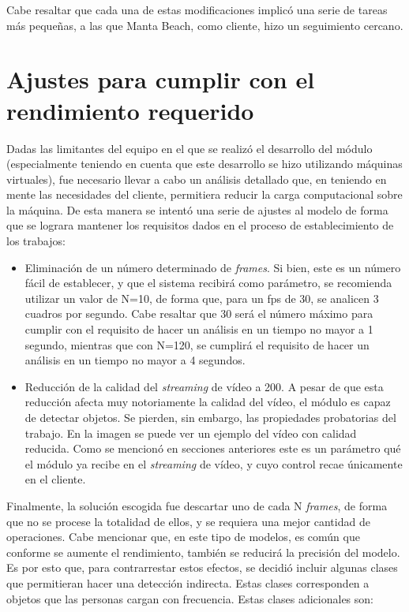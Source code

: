 Cabe resaltar que cada una de estas modificaciones implicó una serie de tareas más pequeñas, a las que Manta Beach, como cliente, hizo un seguimiento cercano.

\section{Ajustes para cumplir con el rendimiento requerido}

Dadas las limitantes del equipo en el que se realizó el desarrollo del módulo (especialmente teniendo en cuenta que este desarrollo se hizo utilizando máquinas virtuales), fue necesario llevar a cabo un análisis detallado que, en teniendo en mente las necesidades del cliente, permitiera reducir la carga computacional sobre la máquina. De esta manera se intentó una serie de ajustes al modelo de forma que se lograra mantener los requisitos dados en el proceso de establecimiento de los trabajos:

\begin{itemize}
 	\item Eliminación de un número determinado de \textit{frames}. Si bien, este es un número fácil de establecer, y que el sistema recibirá como parámetro, se recomienda utilizar un valor de N=10, de forma que, para un fps de 30, se analicen 3 cuadros por segundo. Cabe resaltar que 30 será el número máximo para cumplir con el requisito de hacer un análisis en un tiempo no mayor a 1 segundo, mientras que con N=120, se cumplirá el requisito de hacer un análisis en un tiempo no mayor a 4 segundos.
 	\item Reducción de la calidad del \textit{streaming} de vídeo a 200. A pesar de que esta reducción afecta muy notoriamente la calidad del vídeo, el módulo es capaz de detectar objetos. Se pierden, sin embargo, las propiedades probatorias del trabajo. En la imagen se puede ver un ejemplo del vídeo con calidad reducida. Como se mencionó en secciones anteriores este es un parámetro qué el módulo ya recibe en el \textit{streaming} de vídeo, y cuyo control recae únicamente en el cliente. 
 
\end{itemize}

Finalmente, la solución escogida fue descartar uno de cada N \textit{frames}, de forma que no se procese la totalidad de ellos, y se requiera una mejor cantidad de operaciones. Cabe mencionar que, en este tipo de modelos, es común que conforme se aumente el rendimiento, también se reducirá la precisión del modelo. Es por esto que, para contrarrestar estos efectos, se decidió incluir algunas clases que permitieran hacer una detección indirecta. Estas clases corresponden a objetos que las personas cargan con frecuencia. Estas clases adicionales son: 

